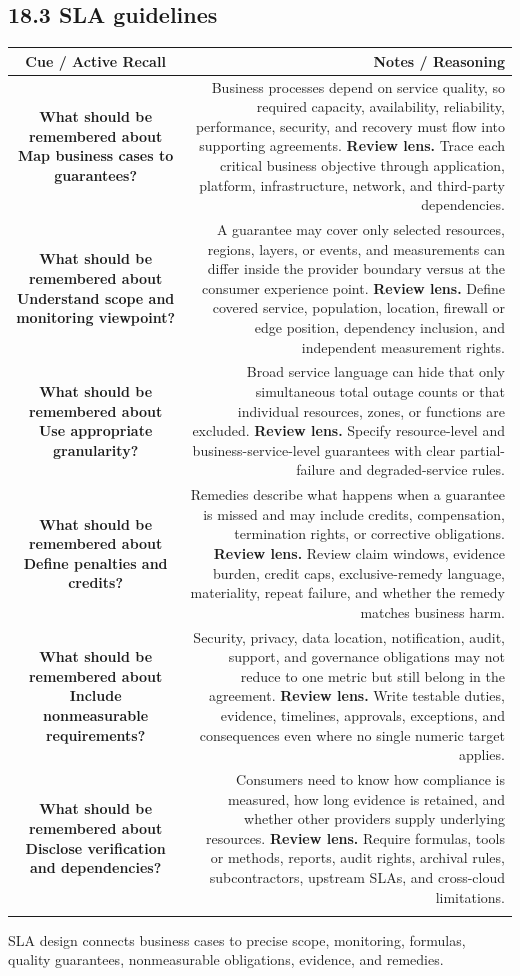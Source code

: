 \documentclass[11pt]{article}
\newcommand{\CornellHeader}{\rowcolor{Navy}\color{white}\bfseries Cue / Active Recall & \color{white}\bfseries Notes / Reasoning \\\endhead}
\newcommand{\CornellRow}[2]{\cellcolor{CueGray}\textbf{#1} & #2 \\\addlinespace[3pt]}
\begin{document}
\subsection{18.3 SLA guidelines}
\begin{longtable}{@{}C N@{}}
\CornellHeader
\CornellRow{What should be remembered about Map business cases to guarantees?}{Business processes depend on service quality, so required capacity, availability, reliability, performance, security, and recovery must flow into supporting agreements. \textbf{Review lens.} Trace each critical business objective through application, platform, infrastructure, network, and third-party dependencies.}
\CornellRow{What should be remembered about Understand scope and monitoring viewpoint?}{A guarantee may cover only selected resources, regions, layers, or events, and measurements can differ inside the provider boundary versus at the consumer experience point. \textbf{Review lens.} Define covered service, population, location, firewall or edge position, dependency inclusion, and independent measurement rights.}
\CornellRow{What should be remembered about Use appropriate granularity?}{Broad service language can hide that only simultaneous total outage counts or that individual resources, zones, or functions are excluded. \textbf{Review lens.} Specify resource-level and business-service-level guarantees with clear partial-failure and degraded-service rules.}
\CornellRow{What should be remembered about Define penalties and credits?}{Remedies describe what happens when a guarantee is missed and may include credits, compensation, termination rights, or corrective obligations. \textbf{Review lens.} Review claim windows, evidence burden, credit caps, exclusive-remedy language, materiality, repeat failure, and whether the remedy matches business harm.}
\CornellRow{What should be remembered about Include nonmeasurable requirements?}{Security, privacy, data location, notification, audit, support, and governance obligations may not reduce to one metric but still belong in the agreement. \textbf{Review lens.} Write testable duties, evidence, timelines, approvals, exceptions, and consequences even where no single numeric target applies.}
\CornellRow{What should be remembered about Disclose verification and dependencies?}{Consumers need to know how compliance is measured, how long evidence is retained, and whether other providers supply underlying resources. \textbf{Review lens.} Require formulas, tools or methods, reports, audit rights, archival rules, subcontractors, upstream SLAs, and cross-cloud limitations.}
\end{longtable}
\begin{sectionsummarybox}
SLA design connects business cases to precise scope, monitoring, formulas, quality guarantees, nonmeasurable obligations, evidence, and remedies.
\end{sectionsummarybox}
\end{document}
